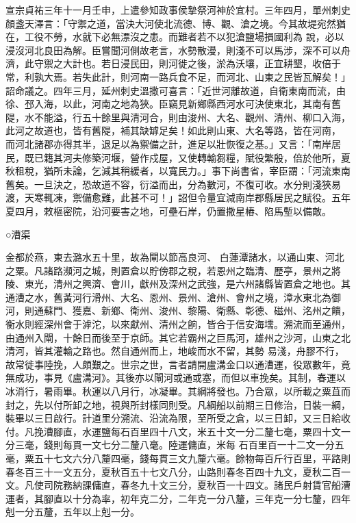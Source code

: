\begin{pinyinscope}
 宣宗貞祐三年十一月壬申，上遣參知政事侯摯祭河神於宜村。三年四月，單州刺史顏盞天澤言：「守禦之道，當決大河使北流德、博、觀、滄之境。今其故堤宛然猶在，工役不勞，水就下必無漂沒之患。而難者若不以犯滄鹽場損國利為
 說，必以浸沒河北良田為解。臣嘗聞河側故老言，水勢散漫，則淺不可以馬涉，深不可以舟濟，此守禦之大計也。若日浸民田，則河徙之後，淤為沃壤，正宜耕墾，收倍于常，利孰大焉。若失此計，則河南一路兵食不足，而河北、山東之民皆瓦解矣！」詔命議之。四年三月，延州刺史溫撒可喜言：「近世河離故道，自衛東南而流，由徐、邳入海，以此，河南之地為狹。臣竊見新鄉縣西河水可決使東北，其南有舊隄，水不能溢，行五十餘里與清河合，則由浚州、大名、觀州、清州、柳口入海，此河之故道也，皆有舊隄，補其缺罅足矣！如此則山東、大名等路，皆在河南，
 而河北諸郡亦得其半，退足以為禦備之計，進足以壯恢復之基。」又言：「南岸居民，既已籍其河夫修築河堰，營作戍屋，又使轉輸芻糧，賦役繁殷，倍於他所，夏秋租稅，猶所未論，乞減其稍緩者，以寬民力。」事下尚書省，宰臣謂：「河流東南舊矣。一旦決之，恐故道不容，衍溢而出，分為數河，不復可收。水分則淺狹易渡，天寒輒凍，禦備愈難，此甚不可！」詔但令量宜減南岸郡縣居民之賦役。五年夏四月，敕樞密院，沿河要害之地，可壘石岸，仍置撒星樁、陷馬塹以備敵。



 ○漕渠



 金都於燕，東去潞水五十里，故為閘以節高良河、
 白蓮潭諸水，以通山東、河北之粟。凡諸路瀕河之城，則置倉以貯傍郡之稅，若恩州之臨清、歷亭，景州之將陵、東光，清州之興濟、會川，獻州及深州之武強，是六州諸縣皆置倉之地也。其通漕之水，舊黃河行滑州、大名、恩州、景州、滄州、會州之境，漳水東北為御河，則通蘇門、獲嘉、新鄉、衛州、浚州、黎陽、衛縣、彰德、磁州、洺州之饋，衡水則經深州會于滹沱，以來獻州、清州之餉，皆合于信安海壖。溯流而至通州，由通州入閘，十餘日而後至于京師。其它若霸州之巨馬河，雄州之沙河，山東之北清河，皆其灌輸之路也。然自通州而上，地峻而水不留，其勢
 易淺，舟膠不行，故常徙事陸挽，人頗艱之。世宗之世，言者請開盧溝金口以通漕運，役眾數年，竟無成功，事見《盧溝河》。其後亦以閘河或通或塞，而但以車挽矣。其制，春運以冰消行，暑雨畢。秋運以八月行，冰凝畢。其綱將發也。乃合眾，以所載之粟苴而封之，先以付所卸之地，視與所封樣同則受。凡綱船以前期三日修治，日裝一綱，裝畢以三日啟行。計道里分溯流、沿流為限，至所受之倉，以三日卸，又三日給收付。凡挽漕腳直，水運鹽每石百里四十八文，米五十文一分二釐七毫，粟四十文一分三毫，錢則每貫一文七分二釐八毫。陸運傭直，米每
 石百里百一十二文一分五毫，粟五十七文六分八釐四毫，錢每貫三文九釐六毫。餘物每百斤行百里，平路則春冬百三十一文五分，夏秋百五十七文八分，山路則春冬百四十九文，夏秋二百一文。凡使司院務納課傭直，春冬九十文三分，夏秋百一十四文。諸民戶射賃官船漕運者，其腳直以十分為率，初年克二分，二年克一分八釐，三年克一分七釐，四年剋一分五釐，五年以上剋一分。




\end{pinyinscope}
